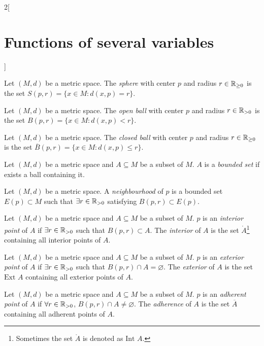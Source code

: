 \documentclass[../../../main.tex]{subfiles}
\begin{document}
\begin{multicols}{2}[\section{Functions of several variables}]
\begin{corollary}
\begin{enumerate}
    \end{enumerate}
  \end{corollary}
  \begin{definition}
    Let $(M,d)$ be a metric space. The \emph{sphere} with center $p$ and radius $r\in\mathbb{R}_{\geq 0}$ is the set $S(p,r)=\{x\in M:d(x,p)=r\}$.
  \end{definition}
  \begin{definition}
    Let $(M,d)$ be a metric space. The \emph{open ball} with center $p$ and radius $r\in\mathbb{R}_{>0}$ is the set $B(p,r)=\{x\in M:d(x,p)<r\}$.
  \end{definition}
  \begin{definition}
    Let $(M,d)$ be a metric space. The \emph{closed ball} with center $p$ and radius $r\in\mathbb{R}_{\geq 0}$ is the set $\overline{B}(p,r)=\{x\in M:d(x,p)\leq r\}$.
  \end{definition}
  \begin{definition}
    Let $(M,d)$ be a metric space and $A\subseteq M$ be a subset of $M$. $A$ is a \emph{bounded set} if exists a ball containing it.
  \end{definition}
  \begin{definition}
    Let $(M,d)$ be a metric space. A \emph{neighbourhood} of $p$ is a bounded set $E(p)\subset M$ such that $\exists r\in\mathbb{R}_{>0}$ satisfying $B(p,r)\subset E(p)$.
  \end{definition}
  \begin{definition}
    Let $(M,d)$ be a metric space and $A\subseteq M$ be a subset of $M$. $p$ is an \emph{interior point} of $A$ if $\exists r\in\mathbb{R}_{>0}$ such that $B(p,r)\subset A$. The \emph{interior} of $A$ is the set $\mathring A$\footnote{Sometimes the set $\mathring A$ is denoted as $\text{Int }A$.} containing all interior points of $A$.
  \end{definition}
  \begin{definition}
    Let $(M,d)$ be a metric space and $A\subseteq M$ be a subset of $M$. $p$ is an \emph{exterior point} of $A$ if $\exists r\in\mathbb{R}_{>0}$ such that $B(p,r)\cap A=\varnothing$. The \emph{exterior} of $A$ is the set $\text{Ext } A$ containing all exterior points of $A$.
  \end{definition}
  \begin{definition}
    Let $(M,d)$ be a metric space and $A\subseteq M$ be a subset of $M$. $p$ is an \emph{adherent point} of $A$ if $\forall r\in\mathbb{R}_{>0}$, $B(p,r)\cap A\ne\varnothing$. The \emph{adherence} of $A$ is the set $\overline{A}$ containing all adherent points of $A$.

\end{definition}
\end{multicols}
\end{document}
